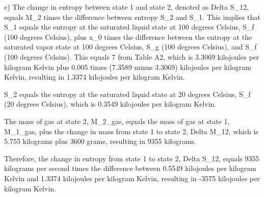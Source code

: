 e) The change in entropy between state 1 and state 2, denoted as Delta S_12, equals M_2 times the difference between entropy S_2 and S_1. This implies that S_1 equals the entropy at the saturated liquid state at 100 degrees Celsius, S_f (100 degrees Celsius), plus x_0 times the difference between the entropy at the saturated vapor state at 100 degrees Celsius, S_g (100 degrees Celsius), and S_f (100 degrees Celsius). This equals 7 from Table A2, which is 3.3069 kilojoules per kilogram Kelvin plus 0.005 times (7.3589 minus 3.3069) kilojoules per kilogram Kelvin, resulting in 1.3374 kilojoules per kilogram Kelvin.

S_2 equals the entropy at the saturated liquid state at 20 degrees Celsius, S_f (20 degrees Celsius), which is 0.3549 kilojoules per kilogram Kelvin.

The mass of gas at state 2, M_2_gas, equals the mass of gas at state 1, M_1_gas, plus the change in mass from state 1 to state 2, Delta M_12, which is 5.755 kilograms plus 3600 grams, resulting in 9355 kilograms.

Therefore, the change in entropy from state 1 to state 2, Delta S_12, equals 9355 kilograms per second times the difference between 0.5549 kilojoules per kilogram Kelvin and 1.3374 kilojoules per kilogram Kelvin, resulting in -3575 kilojoules per kilogram Kelvin.